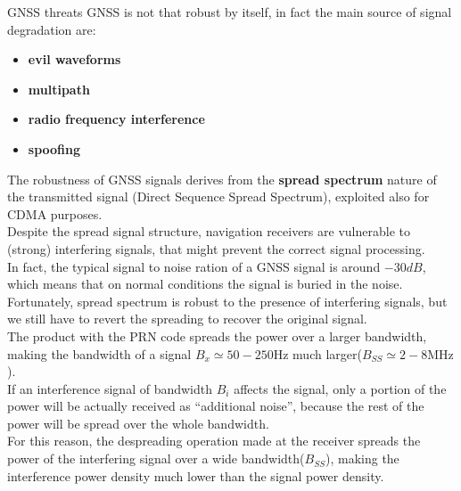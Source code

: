     \begin{section}{GNSS threats}
      GNSS is not that robust by itself, in fact the main source of signal degradation are:
      \begin{itemize}
        \item \textbf{evil waveforms}
        \item \textbf{multipath}
        \item \textbf{radio frequency interference}
        \item \textbf{spoofing}
      \end{itemize}
      The robustness of GNSS signals derives from the \textbf{spread spectrum} nature of the 
      transmitted signal (Direct Sequence Spread Spectrum), exploited also for CDMA purposes.\\
      Despite the spread signal structure, navigation receivers are vulnerable to (strong) 
      interfering signals, that might prevent the correct signal processing.\\

      In fact, the typical signal to noise ration of a GNSS signal is around $-30dB$, which 
      means that on normal conditions the signal is buried in the noise.\\
      Fortunately, spread spectrum is robust to the presence of interfering signals, but we still
      have to revert the spreading to recover the original signal.\\
      The product with the PRN code spreads the power over a larger bandwidth, making the bandwidth
      of a signal $B_x \simeq 50 - 250\text{Hz}$ much larger($B_{SS} \simeq 2-8\text{MHz}$).\\
      If an interference signal of bandwidth $B_i$ affects the signal, only a portion of the power 
      will be actually received as “additional noise”, because the rest of the power will be
      spread over the whole bandwidth.\\

      For this reason, the despreading operation made at the receiver spreads the power of the 
      interfering signal over a wide bandwidth($B_{SS}$), making the interference power density
      much lower than the signal power density.\\


\end{section}
